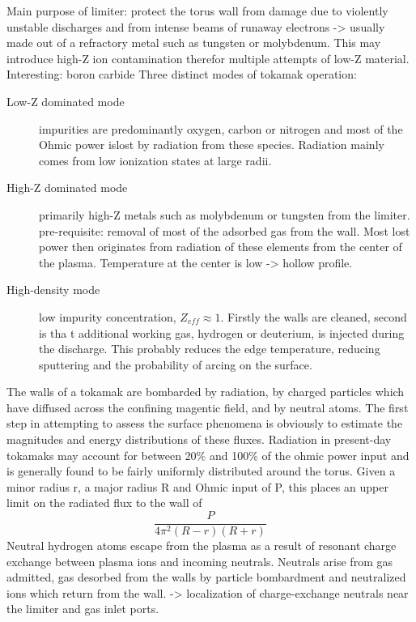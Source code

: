 Main purpose of limiter: protect the torus wall from damage due to violently unstable discharges and from
intense beams of runaway electrons -> usually made out of a refractory metal such as tungsten or molybdenum.
This may introduce high-Z ion contamination therefor multiple attempts of low-Z material.
Interesting: boron carbide
Three distinct modes of tokamak operation:
\begin{description}
    \item[Low-Z dominated mode]
        impurities are predominantly oxygen, carbon or nitrogen and most of the
        Ohmic power islost by radiation from these species.
        Radiation mainly comes from low ionization states at large radii.
    \item[High-Z dominated mode]
        primarily high-Z metals such as molybdenum or tungsten from the limiter.
        pre-requisite: removal of most of the adsorbed gas from the wall.
        Most lost power then originates from radiation of these elements from the center of the plasma.
        Temperature at the center is low -> hollow profile.
    \item[High-density mode]
        low impurity concentration, $Z_{eff} \approx  1$.
        Firstly the walls are cleaned, second is tha t additional working gas, hydrogen or deuterium,
        is injected during the discharge.
        This probably reduces the edge temperature, reducing sputtering and the probability of arcing on
        the surface.
\end{description}
The walls of a tokamak are bombarded by radiation, by charged particles which
have diffused across the confining magentic field, and by neutral atoms. The
first step in attempting to assess the surface phenomena is obviously to
estimate the magnitudes and energy distributions of these fluxes.  Radiation in
present-day tokamaks may account for between 20\% and 100\% of the ohmic power
input and is generally found to be fairly uniformly distributed around the
torus.  Given a minor radius r, a major radius R and Ohmic input of P, this
places an upper limit on the radiated flux to the wall of 
\begin{equation}
    \frac{P}{4\pi^2 (R-r)(R+r)}
\end{equation}
Neutral hydrogen atoms escape from the plasma as a result of resonant charge exchange
between plasma ions and incoming neutrals. Neutrals arise from gas admitted, gas desorbed 
from the walls by particle bombardment and neutralized ions which return from the wall.
-> localization of charge-exchange neutrals near the limiter and gas inlet ports.

